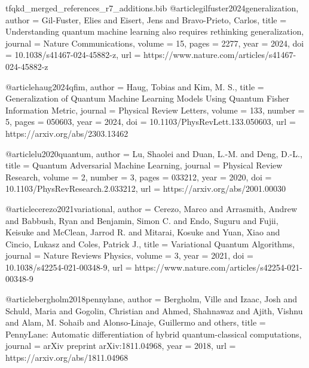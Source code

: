 \begin{filecontents*}{tfqkd_merged_references_r7_additions.bib}
@article{gilfuster2024generalization,
  author  = {Gil-Fuster, Elies and Eisert, Jens and Bravo-Prieto, Carlos},
  title   = {Understanding quantum machine learning also requires rethinking generalization},
  journal = {Nature Communications},
  volume  = {15},
  pages   = {2277},
  year    = {2024},
  doi     = {10.1038/s41467-024-45882-z},
  url     = {https://www.nature.com/articles/s41467-024-45882-z}
}

@article{haug2024qfim,
  author  = {Haug, Tobias and Kim, M. S.},
  title   = {Generalization of Quantum Machine Learning Models Using Quantum Fisher Information Metric},
  journal = {Physical Review Letters},
  volume  = {133},
  number  = {5},
  pages   = {050603},
  year    = {2024},
  doi     = {10.1103/PhysRevLett.133.050603},
  url     = {https://arxiv.org/abs/2303.13462}
}

@article{lu2020quantum,
  author  = {Lu, Shaolei and Duan, L.-M. and Deng, D.-L.},
  title   = {Quantum Adversarial Machine Learning},
  journal = {Physical Review Research},
  volume  = {2},
  number  = {3},
  pages   = {033212},
  year    = {2020},
  doi     = {10.1103/PhysRevResearch.2.033212},
  url     = {https://arxiv.org/abs/2001.00030}
}

@article{cerezo2021variational,
  author  = {Cerezo, Marco and Arrasmith, Andrew and Babbush, Ryan and Benjamin, Simon C. and Endo, Suguru and Fujii, Keisuke and McClean, Jarrod R. and Mitarai, Kosuke and Yuan, Xiao and Cincio, Lukasz and Coles, Patrick J.},
  title   = {Variational Quantum Algorithms},
  journal = {Nature Reviews Physics},
  volume  = {3},
  year    = {2021},
  doi     = {10.1038/s42254-021-00348-9},
  url     = {https://www.nature.com/articles/s42254-021-00348-9}
}

@article{bergholm2018pennylane,
  author  = {Bergholm, Ville and Izaac, Josh and Schuld, Maria and Gogolin, Christian and Ahmed, Shahnawaz and Ajith, Vishnu and Alam, M. Sohaib and Alonso-Linaje, Guillermo and others},
  title   = {PennyLane: Automatic differentiation of hybrid quantum-classical computations},
  journal = {arXiv preprint arXiv:1811.04968},
  year    = {2018},
  url     = {https://arxiv.org/abs/1811.04968}
}
\end{filecontents*}

\documentclass[10pt, journal, letterpaper, twocolumn]{IEEEtran}
\usepackage{amsmath,amssymb,amsfonts,amsthm}
\usepackage{algorithmic}
\usepackage{algorithm}
\usepackage{graphicx}
\usepackage{textcomp}
\usepackage{xcolor}
\usepackage{booktabs}
\usepackage{multirow}
\usepackage{cite}
\usepackage{hyperref}
\usepackage{braket}
\usepackage{float}
\usepackage{tabularx}
\usepackage{balance}
\usepackage{subcaption}
\usepackage{placeins}

